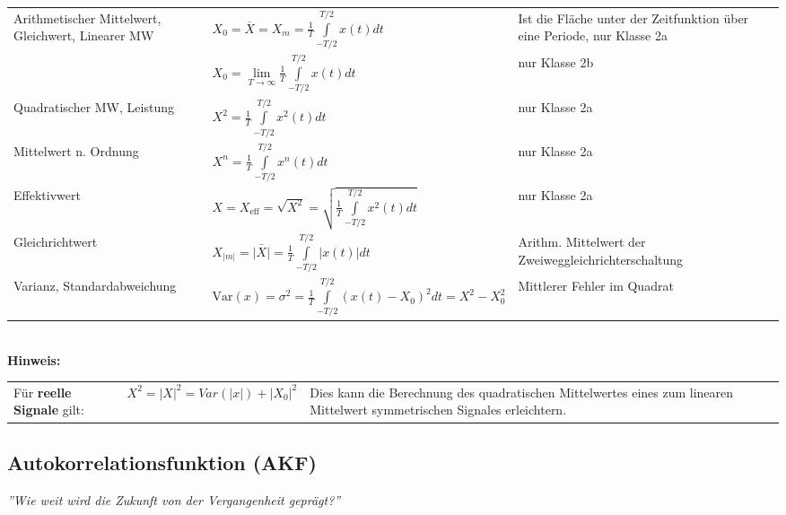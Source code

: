 		\begin{tabularx}{\textwidth}{p{4.7cm}p{8.1cm}X}
			Arithmetischer Mittelwert, Gleichwert, Linearer MW
		&	$X_0 = \overline{X} = X_m = \frac {1} {T} \int\limits_{-T/2}^{T/2} x(t)dt$
		&	Ist die Fläche unter der Zeitfunktion über eine Periode, nur Klasse 2a
		\\
		    {}
		&   $X_0 = \lim\limits_{T\rightarrow \infty}{\frac {1} {T} \int\limits_{-T/2}^{T/2} x(t)dt}$
		&   nur Klasse 2b
		\\
			Quadratischer MW, Leistung
		&	$X^2 = \frac {1} {T} \int\limits_{-T/2}^{T/2} x^2(t)dt$
		& 	nur Klasse 2a
		\\
			Mittelwert n. Ordnung
		&	$X^n = \frac {1} {T} \int\limits_{-T/2}^{T/2} x^n(t)dt$
		& 	nur Klasse 2a
		\\
			Effektivwert
		&	$X = X_{\text{eff}}= \sqrt{X^2} = \sqrt{\frac{1}{T} \int\limits_{-T/2}^{T/2}{x^2(t)dt}}$
		&	nur Klasse 2a
		\\
			Gleichrichtwert
		&	$X_{|m|} = \bar{|X|} = \frac{1}{T} \int\limits_{-T/2}^{T/2}{|x(t)| dt}$
		&	Arithm. Mittelwert der Zweiweggleichrichterschaltung
	    \\
			Varianz, Standardabweichung
		&	$\text{Var}(x)=\sigma^2= \frac {1} {T} \int\limits_{-T/2}^{T/2}(x(t)-X_0)^2dt = X^2-X_0^2$
		&	Mittlerer Fehler im Quadrat
		\\
		\end{tabularx} \\
	
		\textbf{Hinweis:} \\
		\begin{tabularx}{\textwidth}{llX}
			Für \textbf{reelle Signale} gilt: &
			$ X^2 = |X|^2 = Var(|x|) + |X_0|^2 $ &
			Dies kann die Berechnung des quadratischen Mittelwertes eines zum linearen Mittelwert symmetrischen Signales erleichtern.
		\end{tabularx}
		
		
	\subsection{Autokorrelationsfunktion (AKF) } 
		\textit{''Wie weit wird die Zukunft von der Vergangenheit geprägt?''} \\
		
